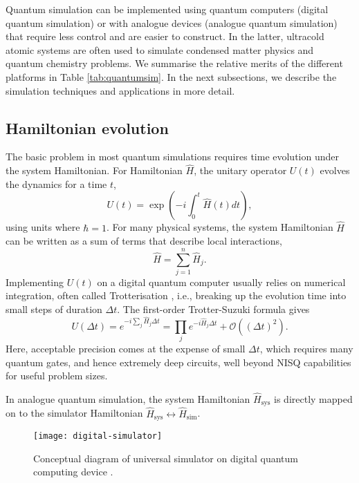 \documentclass[10pt]{iopart}
\begin{document}
Quantum simulation can be implemented using quantum computers (digital quantum simulation) or with analogue devices (analogue quantum simulation) that require less control and are easier to construct. In the latter, ultracold atomic systems are often used to simulate condensed matter physics \cite{Trotzky2012,Choi2016} and quantum chemistry \cite{ArguelloLuengo2019} problems. We summarise the relative merits of the different platforms in Table \ref{tab:quantumsim}.  In the next subsections, we describe the simulation techniques and applications in more detail.

\subsection{Hamiltonian evolution}

The basic problem in most quantum simulations requires time evolution under the system Hamiltonian. For Hamiltonian $\hat{H}$, the unitary operator $U(t)$ evolves the dynamics for a time $t$,
\begin{equation}
U(t) = \exp \left( -i \int_0^t \hat{H}(t) dt \right), 
\end{equation}
using units where $\hbar=1$.
For many physical systems, the system Hamiltonian $\hat{H}$ can be written as a sum of terms that describe local interactions,
\begin{equation}
\hat{H} = \sum_{j=1}^n \hat{H}_j.
\end{equation}
Implementing $U(t)$ on a digital quantum computer usually relies on numerical integration, often called Trotterisation \cite{Hatano2005}, i.e., breaking up the evolution time into small steps of duration $\Delta t$. The first-order Trotter-Suzuki formula gives  
\begin{equation}\label{eq:STformula}
U(\Delta t) 
= e^{-i \sum_j \hat{H}_j \Delta t}
= \prod_j e^{-i\hat{H}_j\Delta t} + \mathcal{O}((\Delta t)^2).
\end{equation}
Here, acceptable precision comes at the expense of small $\Delta t$, which requires many quantum gates, and hence extremely deep circuits, well beyond NISQ capabilities for useful problem sizes.

In analogue quantum simulation, the system Hamiltonian $\hat{H}_\text{sys}$ is directly mapped \cite{Somaroo1999} on to the simulator Hamiltonian $\hat{H}_\text{sys} \leftrightarrow \hat{H}_\text{sim}$.

\begin{figure}[ht!]
\centering
\texttt{[image: digital-simulator]}
\caption{Conceptual diagram of universal simulator on digital quantum computing device \cite{Tacchino2020}.}
\label{fig:universalsimulator}
\end{figure}
\end{document}
